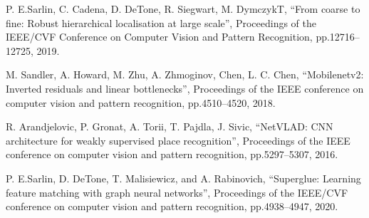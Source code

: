 \documentclass[conference]{IEEEtran}
\begin{document}
\begin{thebibliography}{00}
 P. E.Sarlin, C. Cadena, D. DeTone, R. Siegwart, M. DymczykT, ``From coarse to fine: Robust hierarchical localisation at large scale'', Proceedings of the IEEE/CVF Conference on Computer Vision and Pattern Recognition, pp.12716--12725, 2019.

 M. Sandler, A. Howard, M. Zhu, A. Zhmoginov,  Chen, L. C. Chen, ``Mobilenetv2: Inverted residuals and linear bottlenecks'', Proceedings of the IEEE conference on computer vision and pattern recognition, pp.4510--4520, 2018.

 R. Arandjelovic, P. Gronat, A. Torii, T. Pajdla, J. Sivic, ``NetVLAD: CNN architecture for weakly supervised place recognition'', Proceedings of the IEEE conference on computer vision and pattern recognition, pp.5297--5307, 2016.

 P. E.Sarlin, D. DeTone, T. Malisiewicz, and A. Rabinovich, ``Superglue: Learning feature matching with graph neural networks'', Proceedings of the IEEE/CVF conference on computer vision and pattern recognition, pp.4938--4947, 2020.

\end{thebibliography}
\vspace{12pt}
\end{document}
